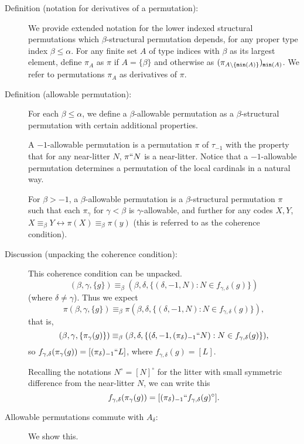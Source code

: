 \documentclass[112pt]{article}
\begin{document}
\begin{description}
\item[Definition (notation for derivatives of a permutation):] We provide extended notation for the lower indexed structural  permutations which  $\beta$-structural permutation depends, for any proper type index $\beta \leq \alpha$.
For any finite set $A$ of type indices with $\beta$ as its largest element, define $\pi_A$ as $\pi$ if $A = \{\beta\}$
and otherwise as $(\pi_{A \setminus \{{\tt min}(A)\}})_{{\tt min}(A)}$.  We refer to permutations $\pi_A$ as derivatives of $\pi$.

\item[Definition (allowable permutation):]  For each $\beta\leq \alpha$, we define a $\beta$-allowable permutation as a $\beta$-structural permutation with certain additional properties.

A $-1$-allowable permutation is a permutation $\pi$ of $\tau_{-1}$ with the property that for any near-litter $N$, $\pi``N$ is a near-litter.  Notice that a $-1$-allowable permutation determines a permutation of the local cardinals in a natural way.

For $\beta>-1$, a $\beta$-allowable permutation is a $\beta$-structural permutation $\pi$ such that each $\pi_\gamma$ for $\gamma<\beta$ is 
$\gamma$-allowable, and further for any codes $X,Y$,  $X \equiv_\beta Y \leftrightarrow \pi(X) \equiv_\beta \pi(y)$ (this is referred to as the coherence condition).



\item[Discussion (unpacking the coherence condition):]  This coherence condition can be unpacked.  $$(\beta,\gamma,\{g\}) \equiv_{\beta} (\beta,\delta,\{(\delta,-1,N):N \in f_{\gamma,\delta}(g)\})$$ (where $\delta\neq \gamma$).  Thus we expect $$\pi(\beta,\gamma,\{g\}) \equiv_{\beta} \pi(\beta,\delta,\{(\delta,-1,N):N \in f_{\gamma,\delta}(g)\}),$$ that is, $$(\beta,\gamma,\{\pi_{\gamma}(g)\}) \equiv_{\beta} (\beta,\delta,\{(\delta,-1,(\pi_{\delta})_{-1}``N):N \in f_{\gamma,\delta}(g)\}),$$ so $f_{\gamma,\delta}(\pi_\gamma(g)) = [(\pi_\delta)_{-1}``L]$, where $f_{\gamma,\delta}(g)=[L]$.  

Recalling the notations $N^\circ=[N]^\circ$ for the litter with small symmetric difference from the near-litter $N$, we can write this $$f_{\gamma,\delta}(\pi_\gamma(g)) = [(\pi_\delta)_{-1}``f_{\gamma,\delta}(g)^\circ].$$

\item[Allowable permutations commute with $A_\delta$:] 

We show this.


\end{description}
\end{document}
